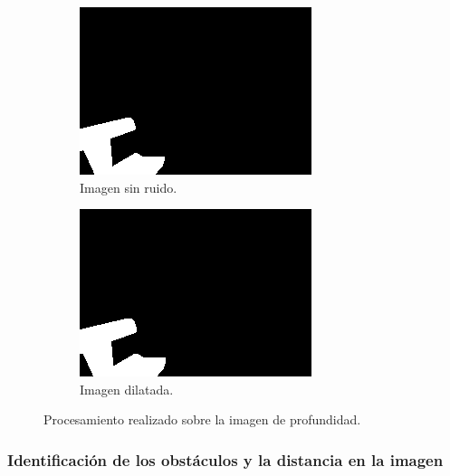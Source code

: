 \begin{figure}
	\begin{subfigure}[b]{.475\textwidth}
    \centering
    \includegraphics[width=\textwidth]{imagenes/cap5/cleaned.png}
    \caption{Imagen sin ruido.}
    \end{subfigure}
    \begin{subfigure}[b]{.475\textwidth}
    \centering
    \includegraphics[width=\textwidth]{imagenes/cap5/dilated.png}
    \caption{Imagen dilatada.}
    \end{subfigure}

    \caption{Procesamiento realizado sobre la imagen de profundidad.}
    \label{fig:chap5-imageprocess}
\end{figure}

\subsubsection{Identificación de los obstáculos y la distancia en la imagen}

